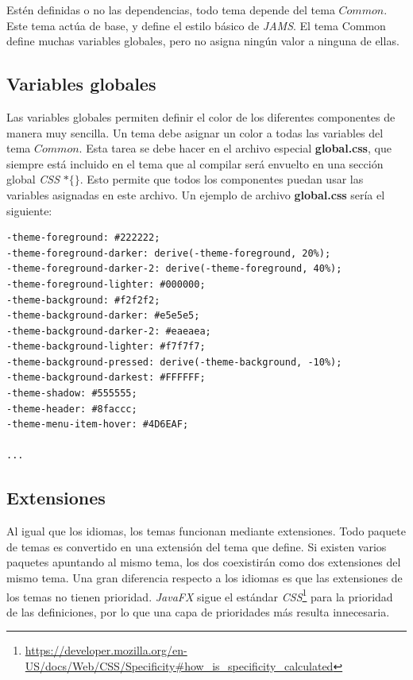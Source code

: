 Estén definidas o no las dependencias,
todo tema depende del tema $Common$.
Este tema actúa de base, y define el estilo básico de \textit{JAMS}.
El tema Common define muchas variables globales, pero no asigna ningún
valor a ninguna de ellas.

\subsection{Variables globales}\label{subsec:variables-globales}

Las variables globales permiten definir el color de los diferentes
componentes de manera muy sencilla.
Un tema debe asignar un color a todas las variables del tema $Common$.
Esta tarea se debe hacer en el archivo especial \textbf{global.css},
que siempre está incluido en el tema que al compilar será envuelto
en una sección global \textit{CSS} $*\{ \}$.
Esto permite que todos los componentes puedan usar
las variables asignadas en este archivo.
Un ejemplo de archivo \textbf{global.css} sería el siguiente:

\begin{lstlisting}[frame=single,label={lst:global.css}]
-theme-foreground: #222222;
-theme-foreground-darker: derive(-theme-foreground, 20%);
-theme-foreground-darker-2: derive(-theme-foreground, 40%);
-theme-foreground-lighter: #000000;
-theme-background: #f2f2f2;
-theme-background-darker: #e5e5e5;
-theme-background-darker-2: #eaeaea;
-theme-background-lighter: #f7f7f7;
-theme-background-pressed: derive(-theme-background, -10%);
-theme-background-darkest: #FFFFFF;
-theme-shadow: #555555;
-theme-header: #8faccc;
-theme-menu-item-hover: #4D6EAF;

...
\end{lstlisting}

\subsection{Extensiones}\label{subsec:temas-extensiones}

Al igual que los idiomas, los temas funcionan mediante extensiones.
Todo paquete de temas es convertido en una extensión del tema que define.
Si existen varios paquetes apuntando al mismo tema, los dos coexistirán
como dos extensiones del mismo tema.
Una gran diferencia respecto a los idiomas es que las extensiones de los temas
no tienen prioridad.
\textit{JavaFX} sigue el estándar
\textit{CSS}\footnote{\url{https://developer.mozilla.org/en-US/docs/Web/CSS/Specificity\#how_is_specificity_calculated}}
para la prioridad de las definiciones,
por lo que una capa de prioridades más resulta innecesaria.

